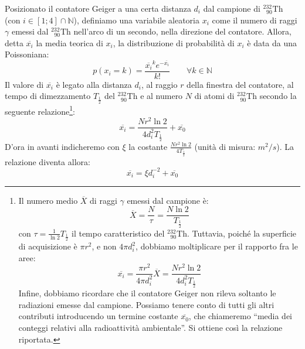 \documentclass{article}
\newcommand*{\Th}{^{232}_{\;\;90} \text{Th}}
\begin{document}
Posizionato il contatore Geiger a una certa distanza $d_i$ dal campione di $\Th$
(con $i\in\left[1;4\right]\cap\mathbb{N}$),
definiamo una variabile aleatoria $x_i$ come il numero di raggi $\gamma$
emessi dal $\Th$ nell'arco di un secondo, nella direzione del contatore.
Allora, detta $\overline{x_i}$ la media teorica
di $x_i$, la distribuzione di probabilità di $x_i$ è data da una Poissoniana:
\[
    p(x_i=k)=\frac{\overline{x_i}^k e^{-\overline{x_i}}}{k!}
    \qquad
    \forall k\in\mathbb{N}
\]
Il valore di $\overline{x_i}$ è legato alla distanza $d_i$, al raggio $r$
della finestra del contatore, al tempo di dimezzamento $T_\frac{1}{2}$ del
$\Th$ e al numero $N$ di atomi di $\Th$ secondo la seguente relazione\footnote{
    Il numero medio $\overline{X}$ di raggi $\gamma$ emessi dal campione è:
    \[
        \overline{X} = \frac{N}{\tau} = \frac{N\ln{2}}{T_\frac{1}{2}}
    \]
    con $\tau=\frac{1}{\ln{2}}T_\frac{1}{2}$ il tempo caratteristico del $\Th$.
    Tuttavia, poiché la superficie di acquisizione è $\pi r^2$, e non $4\pi d_i^2$,
    dobbiamo moltiplicare per il rapporto fra le aree:
    \[
        \overline{x_i} = \frac{\pi r^2}{4\pi d_i^2} \overline{X} =
        \frac{Nr^2\ln{2}}{4 d_i^2 T_\frac{1}{2}}
    \]
    Infine, dobbiamo ricordare che il contatore Geiger non rileva soltanto le
    radiazioni emesse dal campione. Possiamo tenere conto di tutti gli altri
    contributi introducendo un termine costante $\overline{x_0}$, che chiameremo
    “media dei conteggi relativi alla radioattività ambientale”.
    Si ottiene così la relazione riportata.
}:
\[
    \overline{x_i} = \frac{Nr^2\ln{2}}{4 d_i^2 T_\frac{1}{2}} + \overline{x_0}
\]
D'ora in avanti indicheremo con $\xi$ la costante $\frac{Nr^2\ln{2}}{4T_\frac{1}{2}}$
(unità di misura: $\unit{m^2\per s}$).
La relazione diventa allora:
\[\overline{x_i} = \xi d_i^{-2} + \overline{x_0}\]
\end{document}

